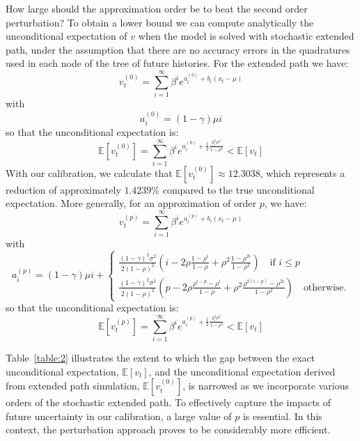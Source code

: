 \documentclass[a4paper,11pt]{amsart}
\begin{document}
How large should the approximation order be to beat the second order
perturbation? To obtain a lower bound we can compute analytically the
unconditional expectation of $v$ when the model is solved with
stochastic extended path, under the assumption that there
are no accuracy errors in the quadratures used in each node of the tree
of future histories. For the extended path we have:
\[
   v_t^{(0)} = \sum_{i=1}^\infty \beta^i e^{a_i^{(0)} + b_i (x_t-\mu)}
\]
with
\[
   a_i^{(0)} = (1-\gamma)\mu i
\]
so that the unconditional expectation is:
\[
   \mathbb E\left[v_t^{(0)}\right] = \sum_{i=1}^\infty \beta^ie^{a_i^{(0)} + \frac{1}{2}\frac{b_i^2\sigma^2}{1-\rho^2}} < \mathbb E\left[v_t\right]
\]
With our calibration, we calculate that $\mathbb{E}\left[v_t^{(0)}\right] \approx 12.3038$, which represents a reduction of approximately $1.4239\%$ compared to the true unconditional expectation. More generally, for an approximation of order $p$, we have:
\[
   v_t^{(p)} = \sum_{i=1}^\infty \beta^i e^{a_i^{(p)} + b_i (x_t-\mu)}
\]
with
\[
   a_i^{(p)} = (1-\gamma)\mu i +
   \begin{cases}
      \frac{(1-\gamma)^2\sigma^2}{2(1-\rho)^2}\left( i - 2\rho\frac{1-\rho^i}{1-\rho} + \rho^2\frac{1-\rho^{2i}}{1-\rho^2} \right)\quad\text{if }i\leq p \\
      \frac{(1-\gamma)^2\sigma^2}{2(1-\rho)^2}\left( p - 2\rho\frac{\rho^{i-p}-\rho^i}{1-\rho} + \rho^2\frac{\rho^{2(i-p)}-\rho^{2i}}{1-\rho^2} \right)\quad\text{otherwise.}
   \end{cases}
\]
so that the unconditional expectation is:
\[
   \mathbb E\left[v_t^{(p)}\right] = \sum_{i=1}^\infty \beta^ie^{a_i^{(p)} + \frac{1}{2}\frac{b_i^2\sigma^2}{1-\rho^2}} < \mathbb E\left[v_t\right]
\]

Table~\ref{table:2} illustrates the extent to which the gap between
the exact unconditional expectation, $\mathbb E\left[ v_t \right]$,
and the unconditional expectation derived from extended path
simulation, $\mathbb E\left[ v_t^{(0)}\right]$, is narrowed as we
incorporate various orders of the stochastic extended path. To
effectively capture the impacts of future uncertainty in our
calibration, a large value of \(p\) is essential. In this context, the
perturbation approach proves to be considerably more
efficient.\newline
\end{document}
